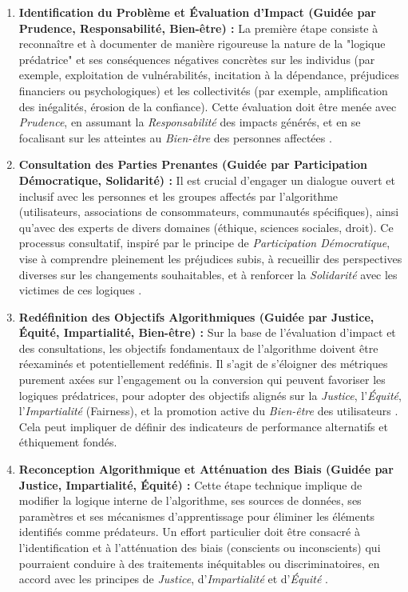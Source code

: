 \documentclass[10pt, twocolumn]{article}
\begin{document}
\begin{enumerate}
    \item \textbf{Identification du Problème et Évaluation d'Impact (Guidée par Prudence, Responsabilité, Bien-être) :} La première étape consiste à reconnaître et à documenter de manière rigoureuse la nature de la "logique prédatrice" et ses conséquences négatives concrètes sur les individus (par exemple, exploitation de vulnérabilités, incitation à la dépendance, préjudices financiers ou psychologiques) et les collectivités (par exemple, amplification des inégalités, érosion de la confiance). Cette évaluation doit être menée avec \textit{Prudence}, en assumant la \textit{Responsabilité} des impacts générés, et en se focalisant sur les atteintes au \textit{Bien-être} des personnes affectées \citep{Montreal2018}.
    \item \textbf{Consultation des Parties Prenantes (Guidée par Participation Démocratique, Solidarité) :} Il est crucial d'engager un dialogue ouvert et inclusif avec les personnes et les groupes affectés par l'algorithme (utilisateurs, associations de consommateurs, communautés spécifiques), ainsi qu'avec des experts de divers domaines (éthique, sciences sociales, droit). Ce processus consultatif, inspiré par le principe de \textit{Participation Démocratique}, vise à comprendre pleinement les préjudices subis, à recueillir des perspectives diverses sur les changements souhaitables, et à renforcer la \textit{Solidarité} avec les victimes de ces logiques \citep{Montreal2018}.
    \item \textbf{Redéfinition des Objectifs Algorithmiques (Guidée par Justice, Équité, Impartialité, Bien-être) :} Sur la base de l'évaluation d'impact et des consultations, les objectifs fondamentaux de l'algorithme doivent être réexaminés et potentiellement redéfinis. Il s'agit de s'éloigner des métriques purement axées sur l'engagement ou la conversion qui peuvent favoriser les logiques prédatrices, pour adopter des objectifs alignés sur la \textit{Justice}, l'\textit{Équité}, l'\textit{Impartialité} (Fairness), et la promotion active du \textit{Bien-être} des utilisateurs \citep{Montreal2018}. Cela peut impliquer de définir des indicateurs de performance alternatifs et éthiquement fondés.
    \item \textbf{Reconception Algorithmique et Atténuation des Biais (Guidée par Justice, Impartialité, Équité) :} Cette étape technique implique de modifier la logique interne de l'algorithme, ses sources de données, ses paramètres et ses mécanismes d'apprentissage pour éliminer les éléments identifiés comme prédateurs. Un effort particulier doit être consacré à l'identification et à l'atténuation des biais (conscients ou inconscients) qui pourraient conduire à des traitements inéquitables ou discriminatoires, en accord avec les principes de \textit{Justice}, d'\textit{Impartialité} et d'\textit{Équité} \citep{Montreal2018}.

\end{enumerate}
\end{document}
